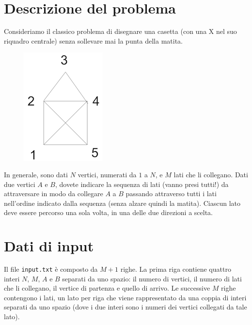 \documentclass[a4paper,11pt]{article}
\begin{document}
\vspace{0.5cm}



\section*{Descrizione del problema}

Consideriamo il classico problema di disegnare una casetta (con una X
nel suo riquadro centrale) senza sollevare mai la punta della
matita. 

\begin{figure}[h!]
  \centering
  \caption{}
  \includegraphics{casetta.png}
\end{figure}

In generale, sono dati $N$ vertici, numerati da $1$ a
$N$, e $M$ lati che li collegano. Dati due vertici
$A$ e $B$, dovete indicare la sequenza di lati
(vanno presi tutti!) da attraversare in modo da collegare $A$
a $B$ passando attraverso tutti i lati nell'ordine indicato
dalla sequenza (senza alzare quindi la matita). Ciascun lato deve
essere percorso una sola volta, in una delle due direzioni a scelta.


\section*{Dati di input}

Il file \texttt{input.txt} è composto da $M+1$
righe. La prima riga contiene quattro interi $N$,
$M$, $A$ e $B$ separati da uno spazio: il
numero di vertici, il numero di lati che li collegano, il vertice di
partenza e quello di arrivo. Le successive $M$ righe
contengono i lati, un lato per riga che viene rappresentato da una
coppia di interi separati da uno spazio (dove i due interi sono i numeri dei vertici collegati da tale lato).
\end{document}
